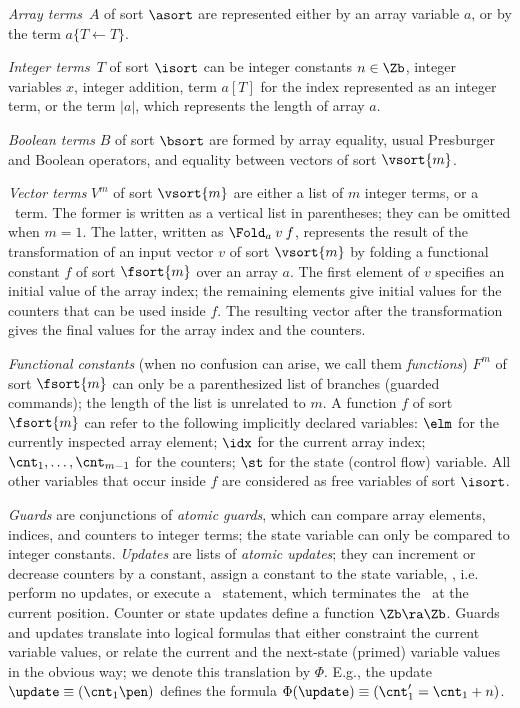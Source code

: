 \emph{Array terms}~$A$ of sort $\asort$ are represented either by an array variable $a$, or by the  term $a\{T \leftarrow T\}$.

\emph{Integer terms}~$T$ of sort $\isort$ can be integer constants $n \in \Zb$, integer variables $x$, integer addition,  term $a[T]$ for the index represented as an integer term, or the term $|a|$, which represents the length of array $a$. 

\emph{Boolean terms} $B$  of sort $\bsort$ are formed by array equality, usual Presburger and Boolean operators, and equality between vectors of sort $\vsort{m}$.

\emph{Vector terms} $V^m$ of sort $\vsort{m}$ are either a list of $m$ integer terms, or a \Fold\ term. The former is written as a vertical list in parentheses; they can be omitted when $m=1$. The latter, written as $\Fold_{a}\:{v}\:{f}$, represents the result of the transformation of an input vector $v$ of sort $\vsort{m}$ by folding a functional constant $f$ of sort $\fsort{m}$ over an array $a$.  The first element of $v$ specifies an initial value of the array index; the remaining elements give initial values for the counters that can be used inside $f$. The resulting vector after the transformation gives the final values for the array index and the counters.

\emph{Functional constants} (when no confusion can arise, we call them  \emph{functions}) $F^m$ of sort $\fsort{m}$ can only be  a parenthesized list of branches (guarded commands); the length of the list is unrelated to $m$. A function $f$ of sort $\fsort{m}$ can refer to the following implicitly declared variables: $\elm$ for the currently inspected array element; $\idx$ for the current array index; $\cnt_1,\ldots,\cnt_{m-1}$ for the counters; $\st$ for the state (control flow) variable. All other variables that occur inside $f$ are considered as free variables of sort $\isort$. 

\emph{Guards} are conjunctions of \emph{atomic guards}, which can compare array elements, indices, and counters to integer terms; the state variable can only be compared  to integer constants. 
\emph{Updates} are lists of \emph{atomic updates}; they can increment or decrease counters by a constant, assign a constant to the state variable, \Skip, i.e. perform no updates, or execute a \Break\ statement, which terminates the \Fold\ at the current position.  Counter or state updates define a function $\Zb \ra \Zb$.
Guards and updates translate into logical formulas that either constraint the current variable values, or relate the current and the next-state (primed) variable values in the obvious way; we denote this translation by $\Phi$. E.g.,
the update $\update \equiv (\cnt_1 \pen)$ defines the formula $\Phi(\update) \equiv (\cnt_1' = \cnt_1+n)$. 

